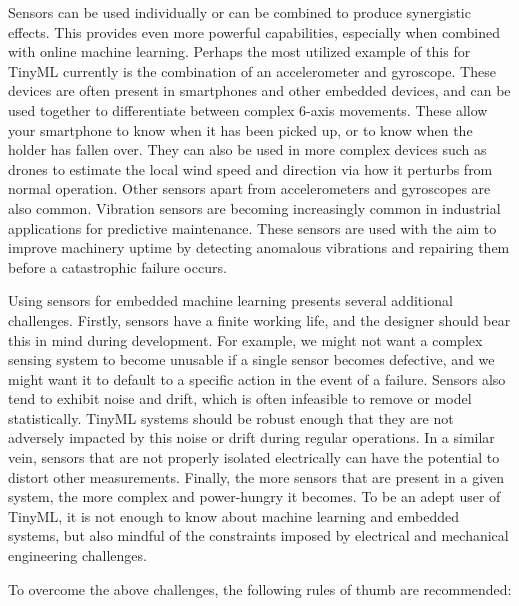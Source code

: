 Sensors can be used individually or can be combined to produce synergistic effects. This provides even more powerful capabilities, especially when combined with online machine learning. Perhaps the most utilized example of this for TinyML currently is the combination of an accelerometer and gyroscope. These devices are often present in smartphones and other embedded devices, and can be used together to differentiate between complex 6-axis movements. These allow your smartphone to know when it has been picked up, or to know when the holder has fallen over. They can also be used in more complex devices such as drones to estimate the local wind speed and direction via how it perturbs from normal operation. Other sensors apart from accelerometers and gyroscopes are also common. Vibration sensors are becoming increasingly common in industrial applications for predictive maintenance. These sensors are used with the aim to improve machinery uptime by detecting anomalous vibrations and repairing them before a catastrophic failure occurs.

Using sensors for embedded machine learning presents several additional challenges. Firstly, sensors have a finite working life, and the designer should bear this in mind during development. For example, we might not want a complex sensing system to become unusable if a single sensor becomes defective, and we might want it to default  to a specific action in the event of a failure. Sensors also tend to exhibit noise and drift, which is often infeasible to remove or model statistically. TinyML systems should be robust enough that they are not adversely impacted by this noise or drift during regular operations. In a similar vein, sensors that are not properly isolated electrically can have the potential to distort other measurements. Finally, the more sensors that are present in a given system, the more complex and power-hungry it becomes. To be an adept user of TinyML, it is not enough to know about machine learning and embedded systems, but also mindful of the constraints imposed by electrical and mechanical engineering challenges.

To overcome the above challenges, the following rules of thumb are recommended:


